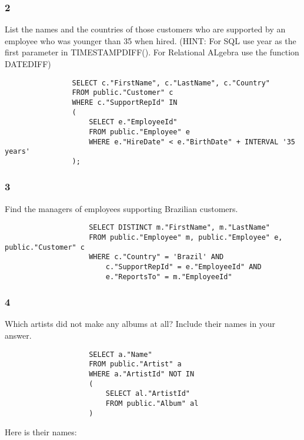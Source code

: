 \documentclass[10pt]{article}
\begin{document}
			
			\subsubsection*{2}

				List the names and the countries of those customers who are supported by an employee
				who was younger than 35 when hired. (HINT: For SQL use year as the first parameter in
				TIMESTAMPDIFF(). For Relational ALgebra use the function DATEDIFF)
				
				\begin{lstlisting}
				SELECT c."FirstName", c."LastName", c."Country"
				FROM public."Customer" c
				WHERE c."SupportRepId" IN
				(
					SELECT e."EmployeeId"
					FROM public."Employee" e
					WHERE e."HireDate" < e."BirthDate" + INTERVAL '35 years'
				);
				\end{lstlisting}
			
			\subsubsection*{3}
			
				Find the managers of employees supporting Brazilian customers.
				
				\begin{lstlisting}
					SELECT DISTINCT m."FirstName", m."LastName"
					FROM public."Employee" m, public."Employee" e, public."Customer" c
					WHERE c."Country" = 'Brazil' AND 
						c."SupportRepId" = e."EmployeeId" AND 
						e."ReportsTo" = m."EmployeeId"
				\end{lstlisting}
				
			
			\subsubsection*{4}
				Which artists did not make any albums at all? Include their names in your answer.
				
				\begin{lstlisting}
					SELECT a."Name"
					FROM public."Artist" a
					WHERE a."ArtistId" NOT IN
					(
						SELECT al."ArtistId"
						FROM public."Album" al
					)
				\end{lstlisting}
				
				Here is their names:
				
\end{document}
